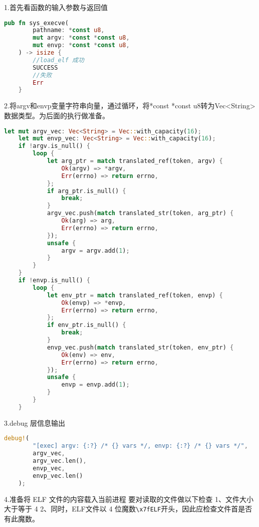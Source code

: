 1.首先看函数的输入参数与返回值
\begin{lstlisting}[language={Rust}, label={code:forktest},
    caption={forktest.rs}]
    pub fn sys_execve(
        pathname: *const u8,
        mut argv: *const *const u8,
        mut envp: *const *const u8,
    ) -> isize {
        //load_elf 成功
        SUCCESS
        //失败
        Err
    }
\end{lstlisting}
2.将argv和envp变量字符串向量，通过循环，将*const *const u8转为Vec<String>数据类型。为后面的执行做准备。
\begin{lstlisting}[language={Rust}, label={code:forktest},
    caption={forktest.rs}]
    let mut argv_vec: Vec<String> = Vec::with_capacity(16);
    let mut envp_vec: Vec<String> = Vec::with_capacity(16);
    if !argv.is_null() {
        loop {
            let arg_ptr = match translated_ref(token, argv) {
                Ok(argv) => *argv,
                Err(errno) => return errno,
            };
            if arg_ptr.is_null() {
                break;
            }
            argv_vec.push(match translated_str(token, arg_ptr) {
                Ok(arg) => arg,
                Err(errno) => return errno,
            });
            unsafe {
                argv = argv.add(1);
            }
        }
    }
    if !envp.is_null() {
        loop {
            let env_ptr = match translated_ref(token, envp) {
                Ok(envp) => *envp,
                Err(errno) => return errno,
            };
            if env_ptr.is_null() {
                break;
            }
            envp_vec.push(match translated_str(token, env_ptr) {
                Ok(env) => env,
                Err(errno) => return errno,
            });
            unsafe {
                envp = envp.add(1);
            }
        }
    }


\end{lstlisting}
3.debug 层信息输出
\begin{lstlisting}[language={Rust}, label={code:forktest},
    caption={forktest.rs}]
    debug!(
        "[exec] argv: {:?} /* {} vars */, envp: {:?} /* {} vars */",
        argv_vec,
        argv_vec.len(),
        envp_vec,
        envp_vec.len()
    );
  \end{lstlisting}
4.准备将 ELF 文件的内容载入当前进程
要对读取的文件做以下检查
    1、文件大小大于等于 4
    2、同时，ELF文件以 4 位魔数\lstinline`\x7fELF`开头，因此应检查文件首是否有此魔数。
